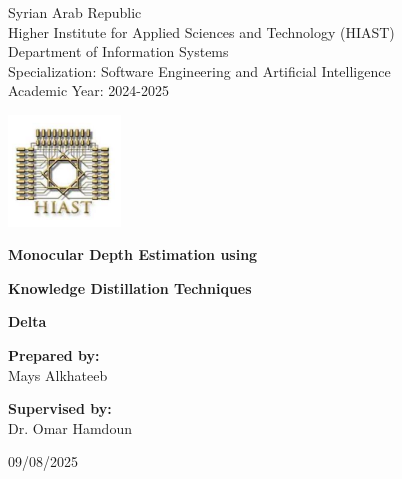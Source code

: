 \documentclass[10pt, a4paper]{report}
\newcommand\frontmatter{%
    \cleardoublepage
    \pagenumbering{roman}}
\begin{document}
\frontmatter

\begin{titlepage}
    \centering 
    \begin{minipage}[t]{1\textwidth}
        \raggedright 
        \large
        Syrian Arab Republic \\
        Higher Institute for Applied Sciences and Technology (HIAST) \\
        Department of Information Systems \\
        Specialization: Software Engineering and Artificial Intelligence \\
        Academic Year: 2024-2025
    \end{minipage}
    
    \vfill 
    \includegraphics[width=3cm]{images/HIAST_logo.png} \par
    
    
    \vspace{2cm} 
    
    {\huge\bfseries Monocular Depth Estimation using \par}
    {\huge\bfseries Knowledge Distillation Techniques \par}
    
    \vspace{1cm}
    
    {\Huge\bfseries Delta \par}
    
    \vfill 
    
    \begin{minipage}[t]{0.4\textwidth}
        \centering
        \large
        \textbf{Prepared by:} \\
        Mays Alkhateeb
    \end{minipage}%
    \begin{minipage}[t]{0.4\textwidth}
        \centering
        \large
        \textbf{Supervised by:} \\
        Dr. Omar Hamdoun
    \end{minipage}
    
    \vfill %
    
    \large{09/08/2025}

\end{titlepage}
\end{document}
